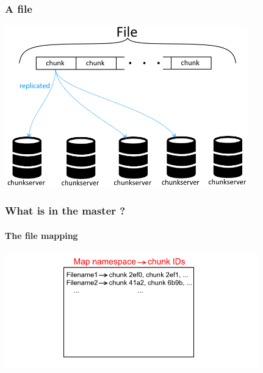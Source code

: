 \documentclass{beamer}
\newcommand{\slideheight}{7cm}
\begin{document}
\begin{frame}
 \frametitle{A file}
 \centering
 \includegraphics[height=\slideheight]{figures/filegfsschema.png}
\end{frame}

\newcommand{\masterpicheight}{5cm}
\begin{frame}
 \frametitle{What is in the master ?}
 \framesubtitle{The file mapping}
 \centering
 \includegraphics[height=\masterpicheight]{figures/namespaceMapschema.png}
\end{frame}
\end{document}
